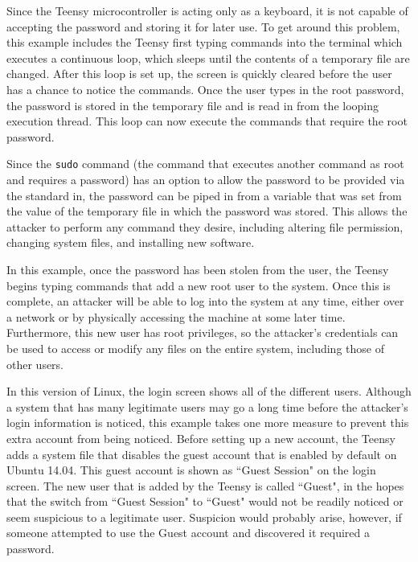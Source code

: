 \documentclass[pagenumbers]{ieee}
\begin{document}
\begin{description}
Since the Teensy microcontroller is acting only as a keyboard, it is not capable of accepting the password and storing it for later use. To get around this problem, this example includes the Teensy first typing commands into the terminal which executes a continuous loop, which sleeps until the contents of a temporary file are changed.  After this loop is set up, the screen is quickly cleared before the user has a chance to notice the commands. Once the user types in the root password, the password is stored in the temporary file and is read in from the looping execution thread. This loop can now execute the commands that require the root password.

Since the \texttt{sudo} command (the command that executes another command as root and requires a password) has an option to allow the password to be provided via the standard in, the password can be piped in from a variable that was set from the value of the temporary file in which the password was stored. This allows the attacker to perform any command they desire, including altering file permission, changing system files, and installing new software.

In this example, once the password has been stolen from the user, the Teensy begins typing commands that add a new root user to the system. Once this is complete, an attacker will be able to log into the system at any time, either over a network or by physically accessing the machine at some later time. Furthermore, this new user has root privileges, so the attacker's credentials can be used to access or modify any files on the entire system, including those of other users. 

In this version of Linux, the login screen shows all of the different users. Although a system that has many legitimate users may go a long time before the attacker's login information is noticed, this example takes one more measure to prevent this extra account from being noticed. Before setting up a new account, the Teensy adds a system file that disables the guest account that is enabled by default on Ubuntu 14.04. This guest account is shown as ``Guest Session" on the login screen. The new user that is added by the Teensy is called ``Guest", in the hopes that the switch from ``Guest Session" to ``Guest" would not be readily noticed or seem suspicious to a legitimate user. Suspicion would probably arise, however, if someone attempted to use the Guest account and discovered it required a password.


\end{description}
\end{document}
